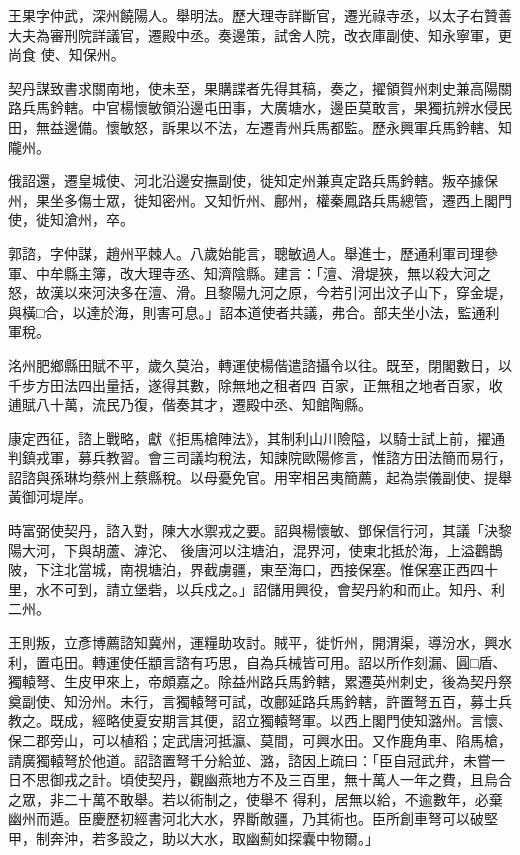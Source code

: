 \begin{pinyinscope}
 王果字仲武，深州饒陽人。舉明法。歷大理寺詳斷官，遷光祿寺丞，以太子右贊善大夫為審刑院詳議官，遷殿中丞。奏邊策，試舍人院，改衣庫副使、知永寧軍，更尚食
 使、知保州。



 契丹謀致書求關南地，使未至，果購諜者先得其稿，奏之，擢領賀州刺史兼高陽關路兵馬鈐轄。中官楊懷敏領沿邊屯田事，大廣塘水，邊臣莫敢言，果獨抗辨水侵民田，無益邊備。懷敏怒，訴果以不法，左遷青州兵馬都監。歷永興軍兵馬鈐轄、知隴州。



 俄詔還，遷皇城使、河北沿邊安撫副使，徙知定州兼真定路兵馬鈐轄。叛卒據保州，果坐多傷士眾，徙知密州。又知忻州、鄜州，權秦鳳路兵馬總管，遷西上閣門使，徙知滄州，卒。



 郭諮，字仲謀，趙州平棘人。八歲始能言，聰敏過人。舉進士，歷通利軍司理參軍、中牟縣主簿，改大理寺丞、知濟陰縣。建言：「澶、滑堤狹，無以殺大河之怒，故漢以來河決多在澶、滑。且黎陽九河之原，今若引河出汶子山下，穿金堤，與橫□合，以達於海，則害可息。」詔本道使者共議，弗合。部夫坐小法，監通利軍稅。



 洺州肥鄉縣田賦不平，歲久莫治，轉運使楊偕遣諮攝令以往。既至，閉閣數日，以千步方田法四出量括，遂得其數，除無地之租者四
 百家，正無租之地者百家，收逋賦八十萬，流民乃復，偕奏其才，遷殿中丞、知館陶縣。



 康定西征，諮上戰略，獻《拒馬槍陣法》，其制利山川險隘，以騎士試上前，擢通判鎮戎軍，募兵教習。會三司議均稅法，知諫院歐陽修言，惟諮方田法簡而易行，詔諮與孫琳均蔡州上蔡縣稅。以母憂免官。用宰相呂夷簡薦，起為崇儀副使、提舉黃御河堤岸。



 時富弼使契丹，諮入對，陳大水禦戎之要。詔與楊懷敏、鄧保信行河，其議「決黎陽大河，下與胡蘆、滹沱、
 後唐河以注塘泊，混界河，使東北抵於海，上溢鸛鵲陂，下注北當城，南視塘泊，界截虜疆，東至海口，西接保塞。惟保塞正西四十里，水不可到，請立堡砦，以兵戍之。」詔儲用興役，會契丹約和而止。知丹、利二州。



 王則叛，立彥博薦諮知冀州，運糧助攻討。賊平，徙忻州，開渭渠，導汾水，興水利，置屯田。轉運使任顓言諮有巧思，自為兵械皆可用。詔以所作刻漏、圓□盾、獨轅弩、生皮甲來上，帝頗嘉之。除益州路兵馬鈐轄，累遷英州刺史，後為契丹祭
 奠副使、知汾州。未行，言獨轅弩可試，改鄜延路兵馬鈐轄，許置弩五百，募士兵教之。既成，經略使夏安期言其便，詔立獨轅弩軍。以西上閣門使知潞州。言懷、保二郡旁山，可以植稻；定武唐河抵瀛、莫間，可興水田。又作鹿角車、陷馬槍，請廣獨轅弩於他道。詔諮置弩千分給並、潞，諮因上疏曰：「臣自冠武弁，未嘗一日不思御戎之計。頃使契丹，觀幽燕地方不及三百里，無十萬人一年之費，且烏合之眾，非二十萬不敢舉。若以術制之，使舉不
 得利，居無以給，不逾數年，必棄幽州而遁。臣慶歷初經書河北大水，界斷敵疆，乃其術也。臣所創車弩可以破堅甲，制奔沖，若多設之，助以大水，取幽薊如探囊中物爾。」




\end{pinyinscope}
